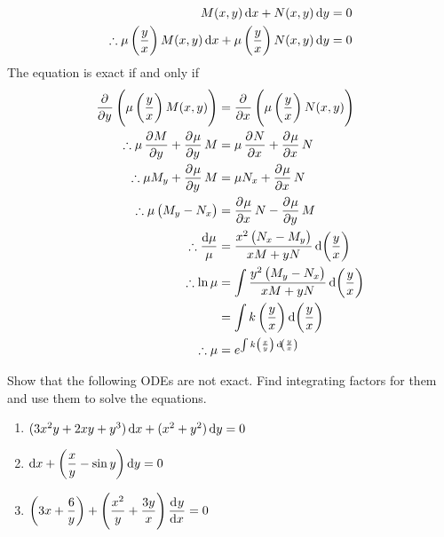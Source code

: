 \documentclass[fleqn, a4paper, 12pt, oneside]{amsart}
\theoremstyle{definition}
\theoremstyle{theorem}
\begin{document}
\begin{solution}
	\begin{align*}
		M(x,y) \dif x + N(x,y) \dif y &= 0\\
		\therefore \mu \left( \dfrac{y}{x} \right) M(x,y) \dif x + \mu \left( \dfrac{y}{x} \right) N(x,y) \dif y &= 0
	\end{align*}
	The equation is exact if and only if
	\begin{align*}
		\dpd{}{y} \left( \mu \left( \dfrac{y}{x} \right) M(x,y) \right) &= \dpd{}{x} \left( \mu \left( \dfrac{y}{x} \right) N(x,y) \right)\\
		\therefore \mu \dpd{M}{y} + \dpd{\mu}{y} M &= \mu \dpd{N}{x} + \dpd{\mu}{x} N\\
		\therefore \mu M_y + \dpd{\mu}{y} M &= \mu N_x + \dpd{\mu}{x} N\\
		\therefore \mu \left( M_y - N_x \right) &= \dpd{\mu}{x} N - \dpd{\mu}{y} M\\
		\therefore \dfrac{\dif \mu}{\mu} &= \dfrac{x^2 \left( N_x - M_y \right)}{xM + yN} \dif \left( \dfrac{y}{x} \right)\\
		\therefore \ln \mu &= \int \dfrac{y^2 \left( M_y - N_x \right)}{xM + yN} \dif \left( \dfrac{y}{x} \right)\\
		&= \int k \left( \dfrac{y}{x} \right) \dif \left( \dfrac{y}{x} \right)\\
		\therefore \mu &= e^{\int k \left( \frac{x}{y} \right) \dif \left( \frac{y}{x} \right)}
	\end{align*}
\end{solution}

\begin{question}
	Show that the following ODEs are not exact.
	Find integrating factors for them and use them to solve the equations.
	\begin{enumerate}[leftmargin=*]
		\item $(3 x^2 y + 2 x y + y^3) \dif x + (x^2 + y^2) \dif y = 0$
		\item $\dif x + \left( \dfrac{x}{y} - \sin y \right) \dif y = 0$
		\item $\left( 3 x + \dfrac{6}{y} \right) + \left( \dfrac{x^2}{y} + \dfrac{3 y}{x} \right) \dod{y}{x} = 0$
	\end{enumerate}
\end{question}
\end{document}
